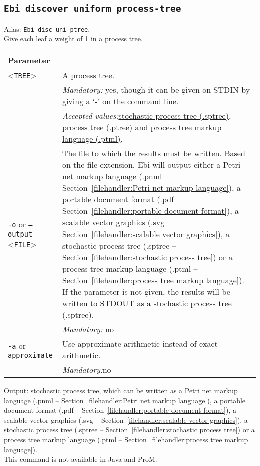 {\subsection{\texttt{Ebi discover uniform process-tree}}
\label{command:Ebi discover uniform process-tree}
Alias: \texttt{Ebi disc uni ptree}.\\
Give each leaf a weight of 1 in a process tree.\\
\begin{tabularx}{\linewidth}{lX}
\toprule
Parameter \\\midrule
<\texttt{TREE}>&A process tree.\\
&\textit{Mandatory:} \quad yes, though it can be given on STDIN by giving a `-' on the command line.\\
&\textit{Accepted values:}\quad \hyperref[filehandler:stochastic process tree]{stochastic process tree (.sptree)}, \hyperref[filehandler:process tree]{process tree (.ptree)} and \hyperref[filehandler:process tree markup language]{process tree markup language (.ptml)}.\\
\texttt{-o} or \texttt{--output} <\texttt{FILE}> &
The file to which the results must be written. Based on the file extension, Ebi will output either a Petri net markup language (.pnml -- Section~\ref{filehandler:Petri net markup language}), a portable document format (.pdf -- Section~\ref{filehandler:portable document format}), a scalable vector graphics (.svg -- Section~\ref{filehandler:scalable vector graphics}), a stochastic process tree (.sptree -- Section~\ref{filehandler:stochastic process tree}) or a process tree markup language (.ptml -- Section~\ref{filehandler:process tree markup language}).
If the parameter is not given, the results will be written to STDOUT as a stochastic process tree (.sptree).\\
&\textit{Mandatory:} \quad no\\
\texttt{-a} or \texttt{--approximate} & Use approximate arithmetic instead of exact arithmetic.\\
&\textit{Mandatory:}\quad no\\
\bottomrule
\end{tabularx}
\noindent Output: stochastic process tree, which can be written as a Petri net markup language (.pnml -- Section~\ref{filehandler:Petri net markup language}), a portable document format (.pdf -- Section~\ref{filehandler:portable document format}), a scalable vector graphics (.svg -- Section~\ref{filehandler:scalable vector graphics}), a stochastic process tree (.sptree -- Section~\ref{filehandler:stochastic process tree}) or a process tree markup language (.ptml -- Section~\ref{filehandler:process tree markup language}).
\\This command is not available in Java and ProM.
}
